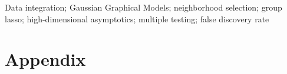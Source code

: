 \documentclass[twoside,11pt]{article}
\numberwithin{equation}{section}
\begin{document}
\vspace{1em}
\begin{keywords}
Data integration; Gaussian Graphical Models; neighborhood selection; group lasso; high-dimensional asymptotics; multiple testing; false discovery rate
\end{keywords}
\newpage

%









\newpage
\appendix
\section*{Appendix}



\end{document}
